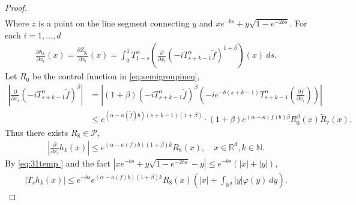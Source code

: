 \documentclass[12pt,oneside,english]{amsart}
\theoremstyle{plain}
\theoremstyle{definition}
\numberwithin{equation}{section}
\begin{document}
\begin{proof}
\begin{align}
  \end{align}
 Where $z$ is a point on the line segment connecting $y$ and $xe^{-bs}+y\sqrt{1-e^{-2bs}}$. For each $i=1,...,d$
 \begin{align}
     \frac{\partial h_k}{\partial x_i}(x)=\frac{\partial Z_{g_k}}{\partial x_i}(x)=\int_0^1 T^{\alpha}_{1-s}\left(\frac{\partial}{\partial x_i}(-i T_{s+k-1}^{\alpha} \tilde{f})^{1+\beta}\right)(x)~ds.
 \end{align}
  Let $R_0$ be the control function in \eqref{eq:semigroupineq},
      \begin{align}
        \left|\frac{\partial}{\partial x_i}(-i T_{s+k-1}^{\alpha}\tilde{f})^{\beta}\right|&=\left|(1+\beta)(-i T_{s+k-1}^{\alpha}\tilde{f})^{\beta}(-i e^{-b(s+k-1)}T_{s+k-1}^{\alpha}\left(\frac{\partial \tilde{f}}{\partial x_i}\right))\right|\\
        &\leq e^{(\alpha-\kappa(\tilde{f})b)(s+k-1)(1+\beta)}\cdot (1+\beta)e^{(\alpha-\kappa(f)b)\beta}R_0^{\beta}(x)\tilde{R}_7(x).
    \end{align}
Thus there exists $R_8\in \mathcal{P}$,
\begin{align}
\label{eq:31temp }
    \left|\frac{\partial}{\partial x_i}h_k(x)\right|\leq e^{(\alpha-\kappa(f)b)(1+\beta)k}R_8(x),\quad x\in \mathbb{R}^d, k\in \mathbb{N}.
\end{align}
By \eqref{eq:31temp } and the fact $|xe^{-bs}+y\sqrt{1-e^{-2bs}}-y|\leq e^{-bs}(|x|+|y|)$,
\begin{align}
    |T_s h_k(x)|\leq e^{-bs}e^{(\alpha-\kappa(f)b)(1+\beta)k}R_8(x)(|x|+\int_{\mathbb{R}^d}|y|\varphi(y)~dy).
\end{align}


\end{proof}
\end{document}
